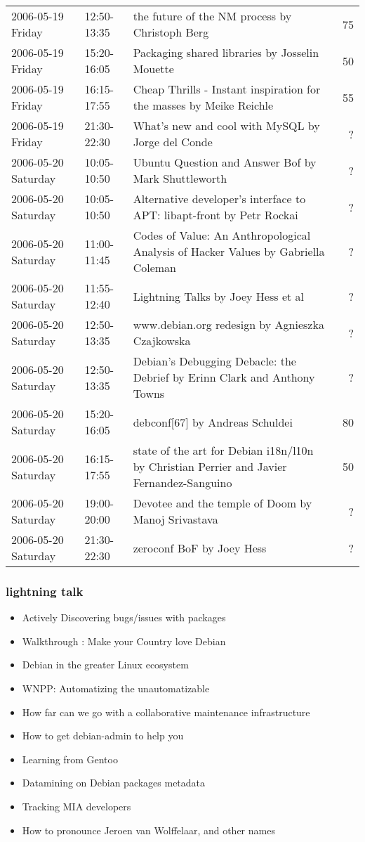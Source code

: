 \documentclass[cjk,dvipdfmx]{beamer}
\begin{document}
\begin{frame}
\begin{center}
{\begin{tabular}{|l|l|p{20em}|r|}
 2006-05-19 Friday & 12:50-13:35 & the future of the NM process by Christoph Berg &  ~75 \\
 2006-05-19 Friday & 15:20-16:05 & Packaging shared libraries by Josselin Mouette &  ~50 \\
 2006-05-19 Friday & 16:15-17:55 & Cheap Thrills - Instant inspiration for the masses by Meike Reichle &  55 \\
 2006-05-19 Friday & 21:30-22:30 & What's new and cool with MySQL by Jorge del Conde &  ? \\
 2006-05-20 Saturday & 10:05-10:50 & Ubuntu Question and Answer Bof by Mark Shuttleworth &  ? \\
 2006-05-20 Saturday & 10:05-10:50 & Alternative developer's interface to APT: libapt-front by Petr Rockai &  ? \\
 2006-05-20 Saturday & 11:00-11:45 & Codes of Value: An Anthropological Analysis of Hacker Values by Gabriella Coleman &  ? \\
 2006-05-20 Saturday & 11:55-12:40 & Lightning Talks by Joey Hess et al &  ? \\
 2006-05-20 Saturday & 12:50-13:35 & www.debian.org redesign by Agnieszka Czajkowska &  ? \\
 2006-05-20 Saturday & 12:50-13:35 & Debian's Debugging Debacle: the Debrief by Erinn Clark and Anthony Towns &  ? \\
 2006-05-20 Saturday & 15:20-16:05 & debconf[67] by Andreas Schuldei &  80 \\
 2006-05-20 Saturday & 16:15-17:55 & state of the art for Debian i18n/l10n by Christian Perrier and Javier Fernandez-Sanguino &  50 \\
 2006-05-20 Saturday & 19:00-20:00 & Devotee and the temple of Doom by Manoj Srivastava &  ? \\
 2006-05-20 Saturday & 21:30-22:30 & zeroconf BoF by Joey Hess &  ? \\
\hline
 \end{tabular}
 }
 \end{center}
\end{frame}


\begin{frame}
\frametitle{lightning talk}
\begin{itemize}
	\item Actively Discovering bugs/issues with packages
	\item Walkthrough : Make your Country love Debian
	\item Debian in the greater Linux ecosystem
	\item WNPP: Automatizing the unautomatizable
	\item How far can we go with a collaborative maintenance infrastructure
	\item How to get debian-admin to help you
	\item Learning from Gentoo
	\item Datamining on Debian packages metadata
	\item Tracking MIA developers
	\item How to pronounce Jeroen van Wolffelaar, and other names
\end{itemize}
\end{frame}
\end{document}
